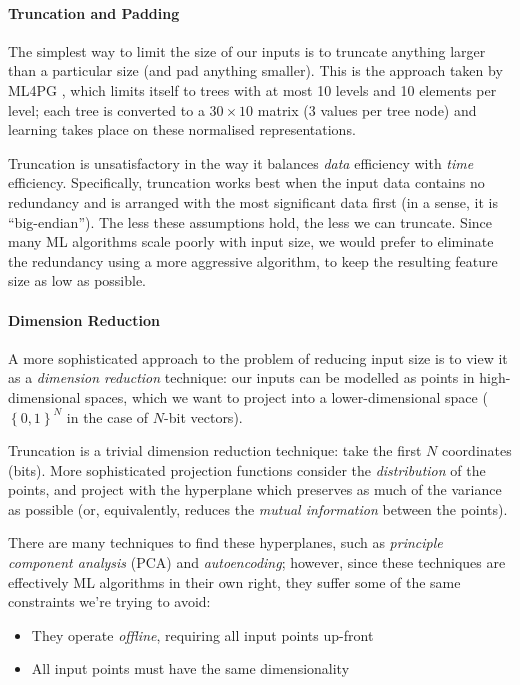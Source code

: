 \paragraph{Truncation and Padding}

The simplest way to limit the size of our inputs is to truncate anything larger than a particular size (and pad anything smaller). This is the approach taken by ML4PG \citep{journals/corr/abs-1302-6421}, which limits itself to trees with at most 10 levels and 10 elements per level; each tree is converted to a $30 \times 10$ matrix (3 values per tree node) and learning takes place on these normalised representations.

Truncation is unsatisfactory in the way it balances \emph{data} efficiency with \emph{time} efficiency. Specifically, truncation works best when the input data contains no redundancy and is arranged with the most significant data first (in a sense, it is ``big-endian''). The less these assumptions hold, the less we can truncate. Since many ML algorithms scale poorly with input size, we would prefer to eliminate the redundancy using a more aggressive algorithm, to keep the resulting feature size as low as possible.

\paragraph{Dimension Reduction}

A more sophisticated approach to the problem of reducing input size is to view it as a \emph{dimension reduction} technique: our inputs can be modelled as points in high-dimensional spaces, which we want to project into a lower-dimensional space ($\left\{ {0, 1} \right\}^N$ in the case of $N$-bit vectors).

Truncation is a trivial dimension reduction technique: take the first $N$ coordinates (bits). More sophisticated projection functions consider the \emph{distribution} of the points, and project with the hyperplane which preserves as much of the variance as possible (or, equivalently, reduces the \emph{mutual information} between the points).

There are many techniques to find these hyperplanes, such as \emph{principle component analysis} (PCA) and \emph{autoencoding}; however, since these techniques are effectively ML algorithms in their own right, they suffer some of the same constraints we're trying to avoid:

\begin{itemize}
  \item They operate \emph{offline}, requiring all input points up-front
  \item All input points must have the same dimensionality
\end{itemize}

